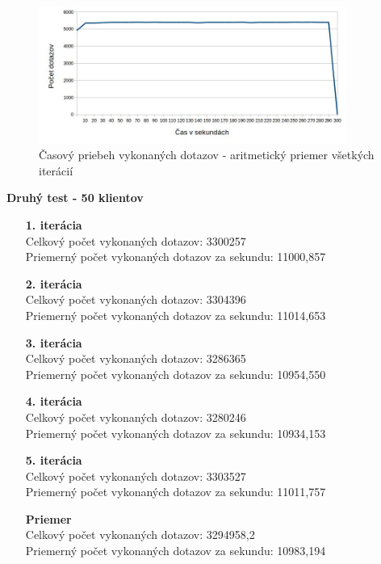 \documentclass[12pt,oneside,final]{fithesis-utf8}
\begin{document}
\begin{itemize}
\begin{figure}[H]
  \centering
      \includegraphics[width=0.9\textwidth]{faban2_1_distr.jpg}
  \caption{Časový priebeh vykonaných dotazov - aritmetický priemer všetkých iterácií}
\end{figure}

\textbf{Druhý test - 50 klientov}
\begin{itemize}

\item[\textbf{1. iterácia}]\ \\
Celkový počet vykonaných dotazov: 3300257\\
Priemerný počet vykonaných dotazov za sekundu: 11000,857

\item[\textbf{2. iterácia}]\ \\
Celkový počet vykonaných dotazov: 3304396\\
Priemerný počet vykonaných dotazov za sekundu: 11014,653

\item[\textbf{3. iterácia}]\ \\
Celkový počet vykonaných dotazov: 3286365\\
Priemerný počet vykonaných dotazov za sekundu: 10954,550

\item[\textbf{4. iterácia}]\ \\
Celkový počet vykonaných dotazov: 3280246\\
Priemerný počet vykonaných dotazov za sekundu: 10934,153

\item[\textbf{5. iterácia}]\ \\
Celkový počet vykonaných dotazov: 3303527\\
Priemerný počet vykonaných dotazov za sekundu: 11011,757

\item[\textbf{Priemer}]\ \\
Celkový počet vykonaných dotazov: 3294958,2\\
Priemerný počet vykonaných dotazov za sekundu: 10983,194


\end{itemize}
\end{itemize}
\end{document}
